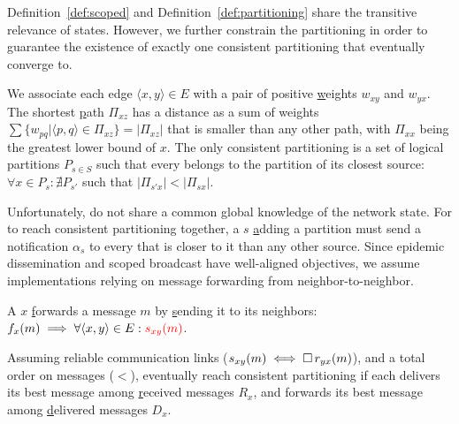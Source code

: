 Definition~\ref{def:scoped} and Definition~\ref{def:partitioning}
share the transitive relevance of \process states. However, we further
constrain the partitioning in order to guarantee the existence of
exactly one consistent partitioning that \processes eventually converge
to.

\begin{definition}
  We associate each edge $\langle x, y \rangle \in E$ with a pair of
  positive \underline{w}eights $w_{xy}$ and $w_{yx}$. The shortest
  \underline{p}ath $\Pi_{xz}$ has a distance as a sum of weights
  $\sum\{w_{pq} | \langle p, q \rangle \in \Pi_{xz}\} = |\Pi_{xz}|$
  that is smaller than any other path, with $\Pi_{xx}$ being the
  greatest lower bound of $x$. The only consistent partitioning is a
  set of logical partitions $P_{s\in S}$ such that every \process
  belongs to the partition of its closest source:
  $\forall x \in P_{s}: \nexists P_{s'}$ such that
  $|\Pi_{s'x}| < |\Pi_{sx}|$.
\end{definition}

Unfortunately, \processes do not share a common global knowledge of
the network state. For \processes to reach consistent partitioning
together, a \Process $s$ \underline{a}dding a partition must send a
notification $\alpha_s$ to every \process that is closer to it than
any other source. Since epidemic dissemination and scoped broadcast
have well-aligned objectives, we assume implementations relying on
message forwarding from neighbor-to-neighbor.

\begin{definition}
  A \process $x$ \underline{f}orwards a message $m$ by
  \underline{s}ending it to its neighbors:
  $f_x(m) \implies \forall \langle x, y\rangle \in E:
  \textcolor{red}{s_{xy}(m)}$.
\end{definition}

\begin{theorem}
    Assuming reliable communication links ($s_{xy}(m) \iff \square\,
    r_{yx}(m)$), and a total order on messages ($<$), \processes
    eventually reach consistent partitioning if each \process delivers
    its best message among \underline{r}eceived messages $R_x$, and
    forwards its best message among \underline{d}elivered messages
    $D_x$.
\end{theorem}

